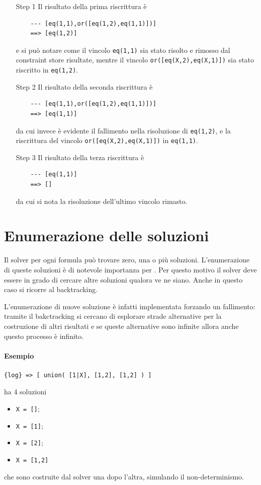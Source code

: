 \documentclass[12pt,a4paper,openright]{book}  %
\begin{document}
\begin{itemize}

	\item[Step 1] Il risultato della prima riscrittura è
	\begin{verbatim}
	--- [eq(1,1),or([eq(1,2),eq(1,1)])]
	==> [eq(1,2)]
	\end{verbatim}
	e si può notare come il vincolo \verb|eq(1,1)| sia stato
        risolto e rimosso dal constraint store risultate, mentre il
        vincolo \verb|or([eq(X,2),eq(X,1)])| sia stato riscritto in
        \verb|eq(1,2)|.

	\item[Step 2] Il risultato della seconda riscrittura è
	\begin{verbatim}
	--- [eq(1,1),or([eq(1,2),eq(1,1)])]
	==> [eq(1,1)]
	\end{verbatim}
	da cui invece è evidente il fallimento nella risoluzione di
        \verb|eq(1,2)|, e la riscrittura del vincolo
        \verb|or([eq(X,2),eq(X,1)])| in \verb|eq(1,1)|.

	\item[Step 3] Il risultato della terza riscrittura è
	\begin{verbatim}
	--- [eq(1,1)]
	==> []
	\end{verbatim}
	da cui si nota la risoluzione dell'ultimo vincolo rimasto.

\end{itemize}

\section{Enumerazione delle soluzioni}
\label{sec:lsetpicat_solutions}

Il solver per ogni formula può trovare zero, una o più
soluzioni. L'enumerazione di queste soluzioni è di notevole importanza
per \lset{}. Per questo motivo il solver deve essere in grado di
cercare altre soluzioni qualora ve ne siano. Anche in questo caso si
ricorre al backtracking.

L'enumerazione di nuove soluzione è infatti implementata forzando un
fallimento: tramite il bakctracking si cercano di esplorare strade
alternative per la costruzione di altri risultati e se queste
alternative sono infinite allora anche questo processo è infinito.

\paragraph{Esempio}
\begin{verbatim}
{log} => [ union( [1|X], [1,2], [1,2] ) ]
\end{verbatim}
ha 4 soluzioni
\begin{itemize}
	\item \verb|X = []|;
	\item \verb|X = [1]|;
	\item \verb|X = [2]|;
	\item \verb|X = [1,2]|
\end{itemize}
che sono costruite dal solver una dopo l'altra, simulando il
non-determinismo.
\end{document}
